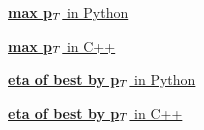 \documentclass[10pt, conference, compsocconf]{IEEEtran}
\begin{document}
\begin{figure}
\scriptsize

\noindent\begin{minipage}{\textwidth}
\begin{minipage}[c][1.8cm][t]{0.22\linewidth}
\underline{{\bf max p$_{\mbox{\tiny T}}$} in Python}

\end{minipage}
\begin{minipage}[c][1.8cm][t]{0.25\linewidth}
\underline{{\bf max p$_{\mbox{\tiny T}}$} in C++}

\end{minipage}

\vspace{0.25 cm}
\begin{minipage}[c][2.6cm][t]{0.22\linewidth}
\underline{{\bf eta of best by p$_{\mbox{\tiny T}}$} in Python}

\end{minipage}
\begin{minipage}[c][2.6cm][t]{0.25\linewidth}
\underline{{\bf eta of best by p$_{\mbox{\tiny T}}$} in C++}

\end{minipage}%


\end{minipage}
\end{figure}
\end{document}
